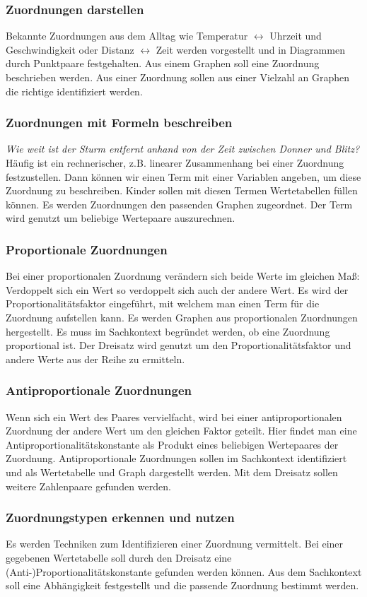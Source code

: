 \documentclass{article}
\begin{document}
\subsubsection*{Zuordnungen darstellen}
Bekannte Zuordnungen aus dem Alltag wie Temperatur $\leftrightarrow$ Uhrzeit und Geschwindigkeit oder Distanz $\leftrightarrow$ Zeit werden vorgestellt und in Diagrammen  durch Punktpaare festgehalten.
Aus einem Graphen soll eine Zuordnung beschrieben werden. Aus einer Zuordnung sollen aus einer Vielzahl an Graphen die richtige identifiziert werden.
\subsubsection*{Zuordnungen mit Formeln beschreiben}
\textit{Wie weit ist der Sturm entfernt anhand von der Zeit zwischen Donner und Blitz?}
Häufig ist ein rechnerischer, z.B. linearer Zusammenhang bei einer Zuordnung festzustellen.
Dann können wir einen Term mit einer Variablen angeben, um diese Zuordnung zu beschreiben.
Kinder sollen mit diesen Termen Wertetabellen füllen können. Es werden Zuordnungen den passenden Graphen zugeordnet.
Der Term wird genutzt um beliebige Wertepaare auszurechnen.
\subsubsection*{Proportionale Zuordnungen}
Bei einer proportionalen Zuordnung verändern sich beide Werte im gleichen Maß: Verdoppelt sich ein Wert so verdoppelt sich auch der andere Wert.
Es wird der Proportionalitätsfaktor eingeführt, mit welchem man einen Term für die Zuordnung aufstellen kann.
Es werden Graphen aus proportionalen Zuordnungen hergestellt. Es muss im Sachkontext begründet werden, ob eine Zuordnung proportional ist.
Der Dreisatz wird genutzt um den Proportionalitätsfaktor und andere Werte aus der Reihe zu ermitteln.

\subsubsection*{Antiproportionale Zuordnungen}
Wenn sich ein Wert des Paares vervielfacht, wird bei einer antiproportionalen Zuordnung der andere Wert um den gleichen Faktor geteilt.
Hier findet man eine Antiproportionalitätskonstante als Produkt eines beliebigen Wertepaares der Zuordnung.
Antiproportionale Zuordnungen sollen im Sachkontext identifiziert und als Wertetabelle und Graph dargestellt werden.
Mit dem Dreisatz sollen weitere Zahlenpaare gefunden werden.
\subsubsection*{Zuordnungstypen erkennen und nutzen}
Es werden Techniken zum Identifizieren einer Zuordnung vermittelt. Bei einer gegebenen Wertetabelle soll durch den Dreisatz eine (Anti-)Proportionalitätskonstante gefunden werden können.
Aus dem Sachkontext soll eine Abhängigkeit festgestellt und die passende Zuordnung bestimmt werden.
\end{document}
